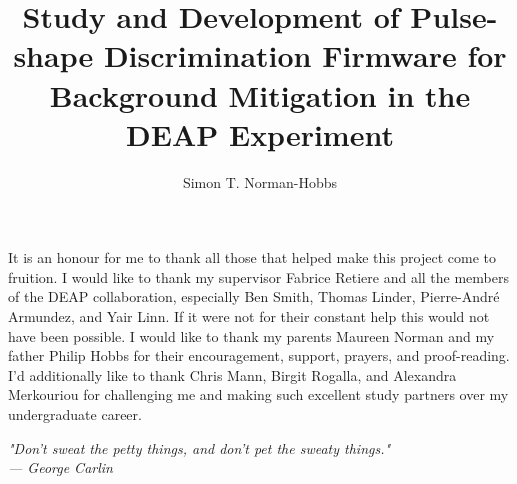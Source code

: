 \documentclass[masters]{ucbthesis}
\begin{document}
\title{Study and Development of Pulse-shape Discrimination Firmware for Background Mitigation in the DEAP Experiment}
\author{Simon T. Norman-Hobbs}


\maketitle




\begin{frontmatter}

\tableofcontents
\clearpage
\listoffigures
\clearpage
\listoftables
\clearpage
\printglossary[title=Table of Symbols]

\begin{acknowledgements}
It is an honour for me to thank all those that helped make this project come to fruition. I would like to thank my supervisor Fabrice Retiere and all the members of the DEAP collaboration, especially Ben Smith, Thomas Linder, Pierre-Andr\'{e}  Armundez, and Yair Linn. If it were not for their constant help this would not have been possible. I would like to thank my parents Maureen Norman and my father Philip Hobbs for their encouragement, support, prayers, and proof-reading. I'd additionally like to thank Chris Mann, Birgit Rogalla, and Alexandra Merkouriou for challenging me and making such excellent study partners over my undergraduate career.


\end{acknowledgements}

\begin{dedication}
	\null\vfil
	\begin{center}
		\textit{
		"Don't sweat the petty things, and don't pet the sweaty things."\\
		--- George Carlin
		}
	\end{center}
	\vfil\null
\end{dedication}


\end{frontmatter}
\pagestyle{headings}






\nocite{*}
\printbibliography
%
\end{document}
